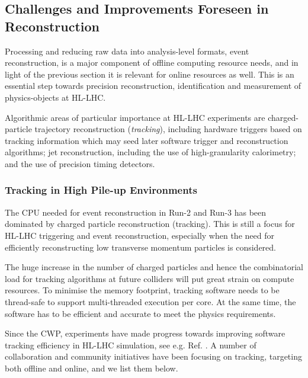 \hypertarget{challenges-and-improvements-foreseen-in-event-reconstruction}{%
\subsection{Challenges and Improvements Foreseen in
Reconstruction}\label{challenges-and-improvements-foreseen-in-event-reconstruction}}

Processing and reducing raw data into analysis-level formats, event
reconstruction, is a major component of offline computing resource
needs, and in light of the previous section it is relevant for online
resources as well. This is an essential step towards precision
reconstruction, identification and measurement of physics-objects at
HL-LHC.

Algorithmic areas of particular importance at HL-LHC experiments are
charged-particle trajectory reconstruction (\textit{tracking}), including
hardware triggers based on tracking information which may seed later
software trigger and reconstruction algorithms; jet reconstruction,
including the use of high-granularity calorimetry; and the use of
precision timing detectors.

\hypertarget{tracking-in-high-pile-up-environments}{%
\subsubsection{Tracking in High Pile-up
Environments}\label{tracking-in-high-pile-up-environments}}

The CPU needed for event reconstruction in Run-2 and Run-3 has been
dominated by charged particle reconstruction (tracking). This is still a
focus for HL-LHC triggering and event reconstruction, especially when
the need for efficiently reconstructing low transverse momentum
particles is considered.

The huge increase in the number of charged particles and hence the
combinatorial load for tracking algorithms at future colliders will put
great strain on compute resources. To minimise the memory footprint,
tracking software needs to be thread-safe to support multi-threaded
execution per core. At the same time, the software has to be efficient
and accurate to meet the physics requirements.

Since the CWP, experiments have made progress towards improving software
tracking efficiency in HL-LHC simulation, see e.g. Ref. \cite{ATL-PHYS-PUB-2019-041}. A
number of collaboration and community initiatives have been focusing on
tracking, targeting both offline and online, and we list them below.

